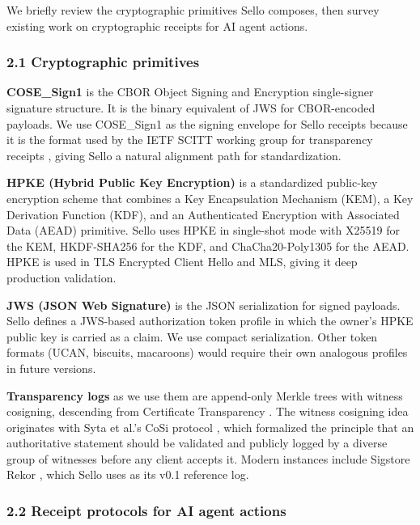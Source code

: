 \documentclass[
  11pt,
]{article}
\begin{document}
We briefly review the cryptographic primitives Sello composes, then
survey existing work on cryptographic receipts for AI agent actions.

\hypertarget{cryptographic-primitives}{%
\subsubsection{2.1 Cryptographic
primitives}\label{cryptographic-primitives}}

\textbf{COSE\_Sign1} \citep{RFC9052} is the CBOR Object Signing and
Encryption single-signer signature structure. It is the binary
equivalent of JWS for CBOR-encoded payloads. We use COSE\_Sign1 as the
signing envelope for Sello receipts because it is the format used by the
IETF SCITT working group for transparency receipts
\citep{scitt-architecture}, giving Sello a natural alignment path for
standardization.

\textbf{HPKE (Hybrid Public Key Encryption)} \citep{RFC9180} is a
standardized public-key encryption scheme that combines a Key
Encapsulation Mechanism (KEM), a Key Derivation Function (KDF), and an
Authenticated Encryption with Associated Data (AEAD) primitive. Sello
uses HPKE in single-shot mode with X25519 for the KEM, HKDF-SHA256 for
the KDF, and ChaCha20-Poly1305 for the AEAD. HPKE is used in TLS
Encrypted Client Hello and MLS, giving it deep production validation.

\textbf{JWS (JSON Web Signature)} \citep{RFC7515} is the JSON
serialization for signed payloads. Sello defines a JWS-based
authorization token profile in which the owner's HPKE public key is
carried as a claim. We use compact serialization. Other token formats
(UCAN, biscuits, macaroons) would require their own analogous profiles
in future versions.

\textbf{Transparency logs} as we use them are append-only Merkle trees
with witness cosigning, descending from Certificate Transparency
\citep{RFC6962, RFC9162}. The witness cosigning idea originates with
Syta et al.'s CoSi protocol \citep{Syta2016}, which formalized the
principle that an authoritative statement should be validated and
publicly logged by a diverse group of witnesses before any client
accepts it. Modern instances include Sigstore Rekor
\citep{sigstore-rekor}, which Sello uses as its v0.1 reference log.

\hypertarget{receipt-protocols-for-ai-agent-actions}{%
\subsubsection{2.2 Receipt protocols for AI agent
actions}\label{receipt-protocols-for-ai-agent-actions}}
\end{document}
